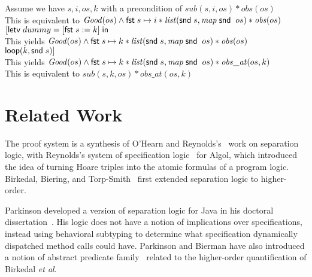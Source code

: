 \begin{tabbedproof}
\oo Assume we have $s, i, os, k$ with a precondition of $\mathit{sub}(s, i, os) * \mathit{obs}(os)$ \\
\oo This is equivalent to $\mathit{Good}(os) \land \mathsf{fst}\; s\mapsto i * \mathit{list}(\mathsf{snd}\; s, \mathit{map}\;\mathsf{snd}\;\;os) * \mathit{obs}(os)$ \\
\oo $[\mathsf{letv}\;dummy = [\mathsf{fst}\; s := k]\;\mathsf{in}\;$ \\
\oo This yields $\mathit{Good}(os) \land \mathsf{fst}\; s\mapsto k * \mathit{list}(\mathsf{snd}\; s, \mathit{map}\;\mathsf{snd}\;\;os) * \mathit{obs}(os)$ \\
\oo $\mathsf{loop}(k, \mathsf{snd}\; s)]$ \\
\oo This yields $\mathit{Good}(os) \land \mathsf{fst}\; s\mapsto k * \mathit{list}(\mathsf{snd}\; s, \mathit{map}\;\mathsf{snd}\;\;os) * \mathit{obs\_at}(os, k)$ \\
\oo This is equivalent to $\mathit{sub}(s, k, os) * \mathit{obs\_at}(os,k)$ 
\end{tabbedproof}

% 

\section{Related Work}
The proof system is a synthesis of O'Hearn and
Reynolds's~\cite{sep-logic} work on separation logic, with Reynolds's
system of specification logic~\cite{spec-logic} for Algol, which
introduced the idea of turning Hoare triples into the atomic formulas
of a program logic. Birkedal, Biering, and Torp-Smith~\cite{hosl}
first extended separation logic to higher-order.

Parkinson developed a version of separation logic for Java in his
doctoral dissertation~\cite{parkinson-thesis}. His logic does not have
a notion of implications over specifications, instead using behavioral
subtyping to determine what specification dynamically dispatched
method calls could have. Parkinson and Bierman have also introduced a
notion of abstract predicate family~\cite{parkinson-bierman-05}
related to the higher-order quantification of Birkedal \emph{et al}.


